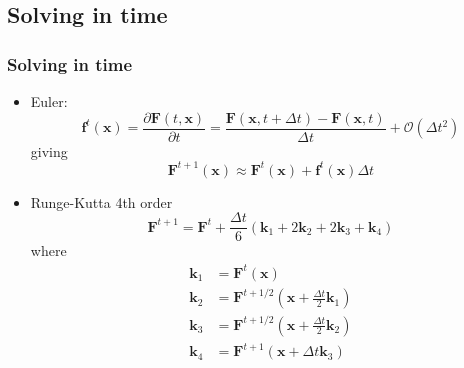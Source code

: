 \documentclass{beamer}
\begin{document}
\subsection{Solving in time}
\begin{frame}[shrink=20]
\frametitle{Solving in time}


\begin{itemize}
    \item Euler:
    \begin{equation}
        \mathbf{f}^t (\mathbf{x})=\frac{\partial \mathbf{F}(t, \mathbf{x}) }{\partial t} = 
        \frac{\mathbf{F}\left( \mathbf{x}, t+\Delta t \right) - \mathbf{F}\left( \mathbf{x}, t \right)}{\Delta t} + \mathcal{O}(\Delta t^2)
        \label{eq:derivative}
    \end{equation}
    giving
    \begin{equation}
        \mathbf{F}^{t+1}(\mathbf{x}) \approx \mathbf{F}^t \left( \mathbf{x} \right) + \mathbf{f}^t (\mathbf{x}) \Delta t
        \label{eq:euler}
    \end{equation}
\item Runge-Kutta 4th order
    \begin{equation}
        \mathbf{F}^{t+1} = \mathbf{F}^{t} + \frac{\Delta t}{6} \left( \mathbf{k}_1 + 2\mathbf{k}_2 + 2\mathbf{k}_3 + \mathbf{k}_4 \right)
        \label{eq:rk4}
    \end{equation}
    where
    \begin{align*}
        \mathbf{k}_1 &= \mathbf{F}^t(\mathbf{x}) \\
        \mathbf{k}_2 &= \mathbf{F}^{t+1/2} \left( \mathbf{x} + \frac{\Delta t }{2} \mathbf{k}_1 \right) \\
        \mathbf{k}_3 &= \mathbf{F}^{t+1/2} \left( \mathbf{x} + \frac{\Delta t }{2} \mathbf{k}_2 \right) \\
        \mathbf{k}_4 &= \mathbf{F}^{t+1} \left( \mathbf{x} + \Delta t \mathbf{k}_3 \right)
    \end{align*}

\end{itemize}

\end{frame}
\end{document}

